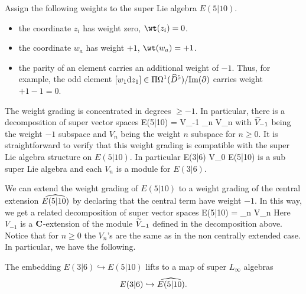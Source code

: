 \documentclass[11pt]{amsart}
\begin{document}
Assign the following weights to the super Lie algebra $E(5|10)$. 
\begin{itemize} 
\item the coordinate $z_i$ has weight zero, $\wt(z_i) = 0$. 
\item the coordinate $w_a$ has weight $+1$, $\wt(w_a) = +1$. 
\item the parity of an element carries an additional weight of $-1$. 
Thus, for example, the odd element $[w_1 \d z_1] \in \Pi \Omega^1(\Hat{D}^5)/{\rm Im}(\del)$ carries weight $+1 - 1 = 0$. 
\end{itemize} 
The weight grading is concentrated in degrees $\geq -1$. 
In particular, there is a decomposition of super vector spaces
\beqn\label{eqn:decomp1}
E(5|10) = \til V_{-1} \times \prod_{n } V_n 
\eeqn
with $\til V_{-1}$ being the weight $-1$ subspace and $V_n$ being the weight $n$ subspace for $n \geq 0$.  
It is straightforward to verify that this weight grading is compatible with the super Lie algebra structure on $E(5|10)$. 
In particular 
\beqn 
\label{eqn:e36iso}
E(3|6) \cong V_0 \subset E(5|10)
\eeqn
is a sub super Lie algebra and each $V_n$ is a module for $E(3|6)$. 

We can extend the weight grading of $E(5|10)$ to a weight grading of the central extension $\Hat{E(5|10)}$ by declaring that the central term have weight $-1$.
In this way, we get a related decomposition of super vector spaces
\beqn\label{eqn:decomp1}
E(5|10) = \prod_{n } V_n
\eeqn
Here $V_{-1}$ is a $\C$-extension of the module $\til V_{-1}$ defined in the decomposition above.
Notice that for $n \geq 0$ the $V_n$'s are the same as in the non centrally extended case.
In particular, we have the following. 

\begin{lem} 
The embedding $E(3|6) \hookrightarrow E(5|10)$ lifts to a map of super $L_\infty$ algebras 
\[
E(3|6) \hookrightarrow \Hat{E(5|10)} .
\]
\end{lem}
\end{document}
